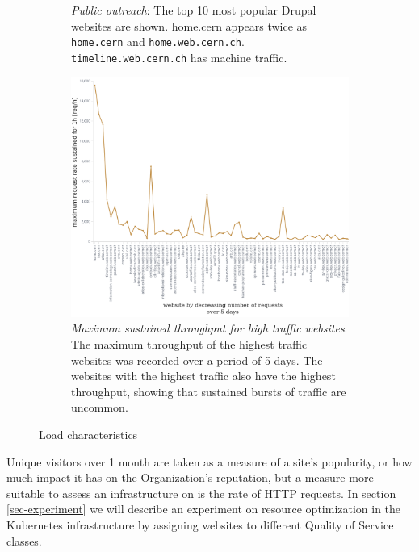 \begin{figure}[t]
\begin{subfigure}[b]{.25\textwidth}
    \caption{\emph{Public outreach}: 
        The top 10 most popular Drupal websites are shown.
        home.cern appears twice as \texttt{home.cern} and \texttt{home.web.cern.ch}.
        {\color{amethyst} \texttt{timeline.web.cern.ch}} has machine traffic.}
    \label{fig-drp-top10-cip}
    \end{subfigure}
    \hfill
    \begin{subfigure}[b]{.7\textwidth}
        \centering
        \includegraphics[width=\textwidth]{figures/website-bandwidth}
        \caption{\emph{Maximum sustained throughput for high traffic websites}.
          The maximum throughput of the highest traffic websites was recorded over a period of 5 days.
          The websites with the highest traffic also have the highest throughput, showing that sustained bursts of traffic are uncommon.}
        \label{fig:website_bandwidth}
    \end{subfigure}
    \vspace{-1.8em}
    \caption{Load characteristics}
    \vspace{-2em}
\end{figure}

Unique visitors over 1 month are taken as a measure of a site's popularity, or how much impact it has on the Organization's reputation,
but a measure more suitable to assess an infrastructure on is the rate of HTTP requests.
In section \ref{sec-experiment} we will describe an experiment on resource optimization in the Kubernetes infrastructure
by assigning websites to different Quality of Service classes.

